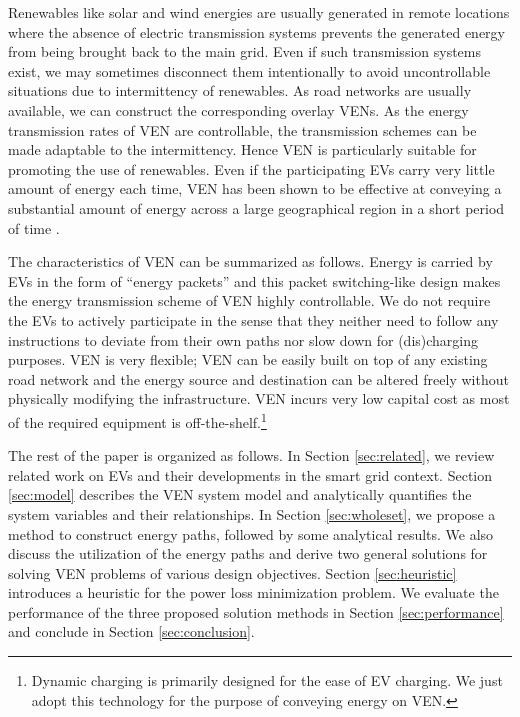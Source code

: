 \documentclass[journal]{IEEEtran}
\begin{document}
Renewables like solar and wind energies are usually generated in remote locations where the absence of electric transmission systems prevents the generated energy from being brought back to the main grid. Even if such transmission systems exist, we may sometimes  disconnect  them intentionally to avoid uncontrollable situations due to intermittency of renewables. 
As road networks are usually available, we can construct the corresponding overlay VENs. As the energy transmission rates of VEN are controllable, the transmission schemes can be made adaptable to the intermittency. Hence VEN is particularly suitable for promoting the use of renewables.
Even if the participating EVs carry very little amount of energy each time, VEN has been shown to be effective at conveying a substantial amount of energy across a large geographical region in a short period of time \cite{VEN}.




The characteristics of VEN can be summarized as follows. Energy is carried by EVs in the form of  ``energy packets'' and this packet switching-like design makes the energy transmission scheme of VEN highly controllable. We do not require the EVs to actively participate in the sense that  they neither need to follow any instructions  to deviate from their own paths nor slow down for (dis)charging purposes. VEN is very flexible; VEN can be easily built on top of any existing road network and the energy source and destination can be altered freely without physically modifying the infrastructure. VEN incurs very low capital cost as most of the required equipment is off-the-shelf.\footnote{Dynamic charging is primarily designed for the ease of EV charging. We just adopt this technology for the purpose of conveying energy on VEN.}

The rest of the paper is organized as follows. In Section \ref{sec:related}, we review related work on EVs and their developments in the smart grid context. Section \ref{sec:model} describes the VEN system model and analytically quantifies the system variables and their relationships. In Section \ref{sec:wholeset}, we propose a method to construct energy paths, followed by some analytical results. We also discuss the utilization of the energy paths and derive two general solutions for solving VEN problems of various design objectives. Section \ref{sec:heuristic} introduces a heuristic for the power loss minimization problem. We evaluate the performance of the three proposed solution methods
in Section \ref{sec:performance} and conclude in Section \ref{sec:conclusion}.
\end{document}
